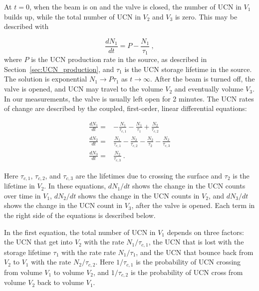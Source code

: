 At $t = 0$, when the beam is on and the valve is closed, the number of UCN in
$V_1$ builds up, while the total number of UCN in $V_2$ and $V_3$ is
zero. This may be described with 

\begin{equation}
  \label{eqn:dndt}
\frac{dN_1}{dt} = P - \frac{N_1}{\tau_1}~,
\end{equation}
where $P$ is the UCN production rate in the source, as described in
Section~\ref{sec:UCN_production}, and $\tau_1$ is the UCN storage
lifetime in the source. The solution is exponential
$N_1 \rightarrow P \tau_1$ as $t \rightarrow \infty$. After the beam
is turned off, the valve is opened, and UCN may travel to the volume
$V_2$ and eventually volume $V_3$. In our measurements, the valve is
usually left open for 2 minutes. The UCN rates of change are described
by the coupled, first-order, linear differential equations:

\begin{equation}
  \label{eqn:alldndt}
  \begin{aligned}
    \frac{dN_1}{dt} =&- \frac{N_1}{\tau_{c,1}} - \frac{N_1}{\tau_1} + \frac{N_2}{\tau_{c,2}}  \\
    \frac{dN_2}{dt} =& \frac{N_1}{\tau_{c,1}} - \frac{N_2}{\tau_{c,2}} - \frac{N_2}{\tau_2} - \frac{N_2}{\tau_{c,3}} \\
    \frac{dN_3}{dt} =& \frac{N_2}{\tau_{c,3}}~.
  \end{aligned}
\end{equation}

Here $\tau_{c,1}$, $\tau_{c,2}$, and $\tau_{c,3}$ are the lifetimes
due to crossing the surface and $\tau_2$ is the lifetime in $V_2$. In
these equations, $dN_1/dt$ shows the change in the UCN counts over
time in $V_1$, $dN_2/dt$ shows the change in the UCN counts in $V_2$,
and $dN_3/dt$ shows the change in the UCN count in $V_3$, after the
valve is opened. Each term in the right side of the equations is
described below.

In the first equation, the total number of UCN in $V_1$ depends on
three factors: the UCN that get into $V_2$ with the rate
$N_1/\tau_{c,1}$, the UCN that is lost with the storage lifetime
$\tau_1$ with the rate rate $N_1/\tau_{1}$, and the UCN that bounce
back from $V_2$ to $V_1$ with the rate $N_2/\tau_{c,2}$. Here
$1/\tau_{c,1}$ is the probability of UCN crossing from volume $V_1$ to
volume $V_2$, and $1/\tau_{c,2}$ is the probability of UCN cross from
volume $V_2$ back to volume $V_1$.


